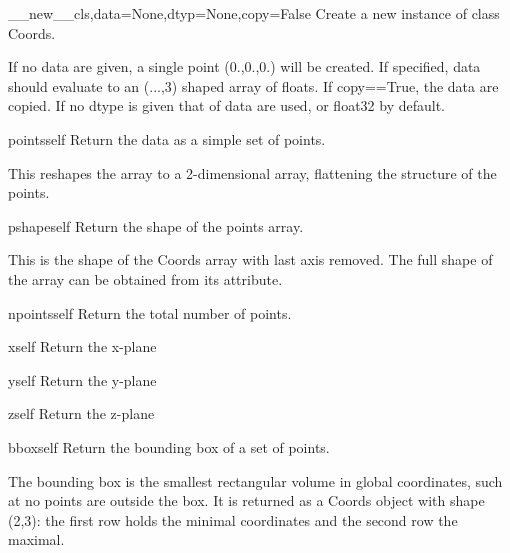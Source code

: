 \begin{funcdesc}{__new__}{cls,data=None,dtyp=None,copy=False}
Create a new instance of class Coords.

        If no data are given, a single point (0.,0.,0.) will be created.
        If specified, data should evaluate to an (...,3) shaped array of floats.
        If copy==True, the data are copied.
        If no dtype is given that of data are used, or float32 by default.
        
\end{funcdesc}

\begin{funcdesc}{points}{self}
Return the data as a simple set of points.

        This reshapes the array to a 2-dimensional array, flattening
        the structure of the points.
        
\end{funcdesc}

\begin{funcdesc}{pshape}{self}
Return the shape of the points array.

        This is the shape of the Coords array with last axis removed.
        The full shape of the  array can be obtained from
        its  attribute.
        
\end{funcdesc}

\begin{funcdesc}{npoints}{self}
Return the total number of points.
\end{funcdesc}

\begin{funcdesc}{x}{self}
Return the x-plane
\end{funcdesc}

\begin{funcdesc}{y}{self}
Return the y-plane
\end{funcdesc}

\begin{funcdesc}{z}{self}
Return the z-plane
\end{funcdesc}

\begin{funcdesc}{bbox}{self}
Return the bounding box of a set of points.

        The bounding box is the smallest rectangular volume in global
        coordinates, such at no points are outside the box.
        It is returned as a Coords object with shape (2,3): the first row
        holds the minimal coordinates and the second row the maximal.
        
\end{funcdesc}

